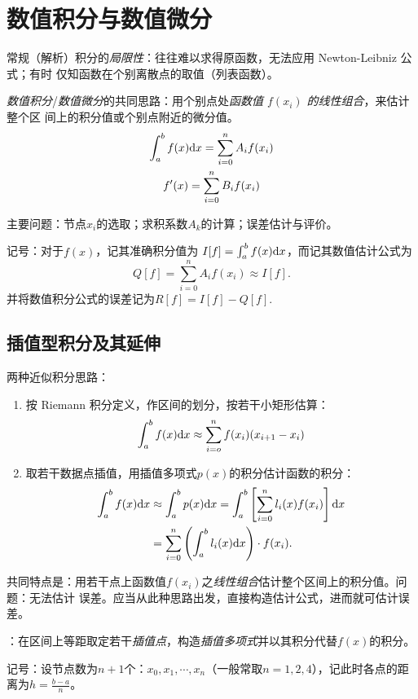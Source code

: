 \chapter{数值积分与数值微分}

\entry 常规（解析）积分的\emph{局限性}：往往难以求得原函数，无法应用 Newton-Leibniz 公式；有时
仅知函数在个别离散点的取值（列表函数）。

\entry \emph{数值积分}/\emph{数值微分}的共同思路：用个别点处\emph{函数值 $f(x_i)$ 的线性组合}，来估计整个区
间上的积分值或个别点附近的微分值。
\begin{gather}
\int_a^bf(x)\mathrm{d} x=\sum_{i=0}^nA_if(x_i)\\
f'(x)=\sum_{i=0}^nB_if(x_i)
\end{gather}

\entry 主要问题：节点$x_i$的选取；求积系数$A_k$的计算；误差估计与评价。

\entry 记号：对于$f(x)$，记其准确积分值为 $I[f]=\int_a^bf(x)\mathrm{d} x$，而记其数值估计公式为
\[Q[f]=\sum_{i=0}^nA_if(x_i)\approx I[f].\]
并将数值积分公式的误差记为$R[f]=I[f]-Q[f]$.

\section{插值型积分及其延伸}
\entry\label{6-et1} 两种近似积分思路：
\begin{enumerate}
    \item 按 Riemann 积分定义，作区间的划分，按若干小矩形估算：
    \[\int_a^bf(x)\mathrm{d} x\approx\sum_{i=o}^nf(x_i)(x_{i+1}-x_i)\]
    \item 取若干数据点插值，用插值多项式$p(x)$的积分估计函数的积分：
    \[\begin{aligned}
    \int_a^bf(x)\mathrm{d} x&\approx\int_a^bp(x)\mathrm{d} x
    =\int_a^b\left[\sum_{i=0}^nl_i(x)f(x_i)\right]\mathrm{d} x\\
    &=\sum_{i=0}^n\left(\int_a^bl_i(x)\mathrm{d} x\right)\cdot f(x_i).
    \end{aligned}\]
\end{enumerate}
共同特点是：用若干点上函数值$f(x_i)$之\emph{线性组合}估计整个区间上的积分值。问题：无法估计
误差。应当从此种思路出发，直接构造估计公式，进而就可估计误差。

\entry {}：在区间上等距取定若干\emph{插值点}，构造\emph{插值多项式}并以其积分代替$f(x)$的积分。

\entry 记号：设节点数为$n+1$个：$x_0,x_1,\cdots,x_n$（一般常取$n=1,2,4$），记此时各点的距离为$h=\frac{b-a}n$。

